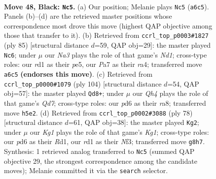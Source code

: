 \documentclass[11pt]{article}
\begin{document}
\clearpage

\begin{figure}[p]\centering
\begin{subfigure}{0.46\textwidth}\centering
\resizebox{\linewidth}{!}{%
\newchessgame
\chessboard[
  setfen={5rk1/p7/np1P4/4Qp1q/P1p5/6P1/1P6/R2R2K1 b - - 3 48},
  showmover=false,
  pgfstyle=straightmove, color=movearrow, markmove={a6-c5}
]}
\caption{}
\end{subfigure}\hfill
\begin{subfigure}{0.46\textwidth}\centering
\resizebox{\linewidth}{!}{%
\newchessgame
\chessboard[
  setfen={3n1rk1/5pp1/7p/2q1P3/R3P2P/2P2Q2/5R1K/8 b - - 0 43},
  showmover=false,
  pgfstyle=straightmove, color=movearrow, markmove={d8-c6}
]}
\caption{}
\end{subfigure}
\\[4pt]
\begin{subfigure}{0.46\textwidth}\centering
\resizebox{\linewidth}{!}{%
\newchessgame
\chessboard[
  setfen={rk6/3Q4/1r5p/4P1pP/8/1p3qP1/1P3P2/5RK1 w - - 2 53},
  showmover=false,
  pgfstyle=straightmove, color=movearrow, markmove={d7-d8}
]}
\caption{}
\end{subfigure}\hfill
\begin{subfigure}{0.46\textwidth}\centering
\resizebox{\linewidth}{!}{%
\newchessgame
\chessboard[
  setfen={5rk1/rq4p1/p2Pp3/4PpP1/Q7/5N2/5P2/3R2K1 w - - 2 40},
  showmover=false,
  pgfstyle=straightmove, color=movearrow, markmove={g1-g2}
]}
\caption{}
\end{subfigure}
\caption{\textbf{Move 48, Black: \texttt{Nc5}.} (a) Our position; Melanie plays \texttt{Nc5} (\texttt{a6c5}). Panels (b)--(d) are the retrieved master positions whose correspondence most drove this move (highest QAP objective among those that transfer to it). (b) Retrieved from \texttt{ccrl\_top\_p0003\#1827} (ply 85) [structural distance $d$=59, QAP obj=29]: the master played \texttt{Nc6}; under $\mu$ our \emph{Na3} plays the role of that game's \emph{Nd1}; cross-type roles: our \emph{r}d1 as their \emph{p}e5, our \emph{P}a7 as their \emph{r}a4; transferred move \texttt{a6c5} \textbf{(endorses this move)}. (c) Retrieved from \texttt{ccrl\_top\_p0000\#1079} (ply 104) [structural distance $d$=54, QAP obj=57]: the master played \texttt{Qd8+}; under $\mu$ our \emph{Qh4} plays the role of that game's \emph{Qd7}; cross-type roles: our \emph{p}d6 as their \emph{r}a8; transferred move \texttt{h5e2}. (d) Retrieved from \texttt{ccrl\_top\_p0002\#3088} (ply 78) [structural distance $d$=61, QAP obj=38]: the master played \texttt{Kg2}; under $\mu$ our \emph{Kg1} plays the role of that game's \emph{Kg1}; cross-type roles: our \emph{p}d6 as their \emph{R}d1, our \emph{r}d1 as their \emph{N}f3; transferred move \texttt{g8h7}. Synthesis: 1 retrieved analog transferred to \texttt{Nc5} (summed QAP objective 29, the strongest correspondence among the candidate moves); Melanie committed it via the \texttt{search} selector.}
\label{fig:thought-m95}
\end{figure}
\end{document}
